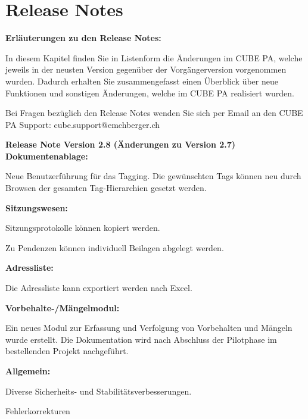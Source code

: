 
\clearpage
\section{Release Notes}

\textbf{Erläuterungen zu den Release Notes:}

\vspace{\baselineskip}

In diesem Kapitel finden Sie in Listenform die Änderungen im CUBE PA, welche jeweils in der neusten Version gegenüber der Vorgängerversion vorgenommen wurden. Dadurch erhalten Sie zusammengefasst einen Überblick über neue Funktionen und sonstigen Änderungen, welche im CUBE PA realisiert wurden.

\vspace{\baselineskip}

Bei Fragen bezüglich den Release Notes wenden Sie sich per Email an den CUBE PA Support: {\color{red} cube.support@emchberger.ch}

\vspace{\baselineskip}

\textbf{Release Note Version 2.8 (Änderungen zu Version 2.7)} \\
\textbf{Dokumentenablage:}
\begin{compactitem}
	\item Neue Benutzerführung für das Tagging. Die gewünschten Tags können neu durch Browsen der gesamten Tag-Hierarchien gesetzt werden.
\end{compactitem}
\textbf{Sitzungswesen:}
\begin{compactitem}
	\item Sitzungsprotokolle können kopiert werden.
	\item Zu Pendenzen können individuell Beilagen abgelegt werden.
\end{compactitem}
\textbf{Adressliste:}
\begin{compactitem}
	\item Die Adressliste kann exportiert werden nach Excel.
\end{compactitem}
\textbf{Vorbehalte-/Mängelmodul:}
\begin{compactitem}
	\item Ein neues Modul zur Erfassung und Verfolgung von Vorbehalten und Mängeln wurde erstellt. Die Dokumentation wird nach Abschluss der Pilotphase im bestellenden Projekt nachgeführt.
\end{compactitem}
\textbf{Allgemein:}
\begin{compactitem}
	\item Diverse Sicherheits- und Stabilitätsverbesserungen.
	\item Fehlerkorrekturen
\end{compactitem}
\vspace{\baselineskip}

